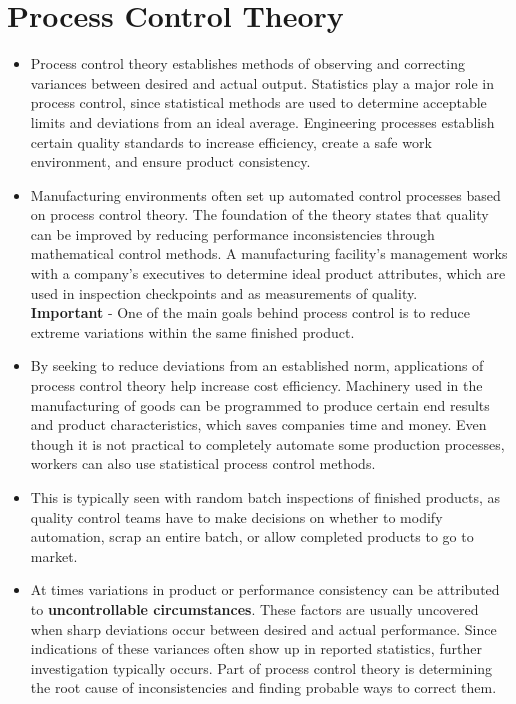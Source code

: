 \documentclass[12pt]{article}
\begin{document}
\section{Process Control Theory}
\begin{itemize}
\item Process control theory establishes methods of observing and correcting variances between desired and actual output. Statistics play a major role in process control, since statistical methods are used to determine acceptable limits and deviations from an ideal average. Engineering processes establish certain quality standards to increase efficiency, create a safe work environment, and ensure product consistency.

\item Manufacturing environments often set up automated control processes based on process control theory. The foundation of the theory states that quality can be improved by reducing performance inconsistencies through mathematical control methods. A manufacturing facility's management works with a company's executives to determine ideal product attributes, which are used in inspection checkpoints and as measurements of quality. \\
\textbf{Important} - One of the main goals behind process control is to reduce extreme variations within the same finished product.

\item By seeking to reduce deviations from an established norm, applications of process control theory help increase cost efficiency. Machinery used in the manufacturing of goods can be programmed to produce certain end results and product characteristics, which saves companies time and money. Even though it is not practical to completely automate some production processes, workers can also use statistical process control methods. 
\item This is typically seen with random batch inspections of finished products, as quality control teams have to make decisions on whether to modify automation, scrap an entire batch, or allow completed products to go to market.

\item At times variations in product or performance consistency can be attributed to \textbf{uncontrollable circumstances}. These factors are usually uncovered when sharp deviations occur between desired and actual performance. Since indications of these variances often show up in reported statistics, further investigation typically occurs. Part of process control theory is determining the root cause of inconsistencies and finding probable ways to correct them.


\end{itemize}
\end{document}
